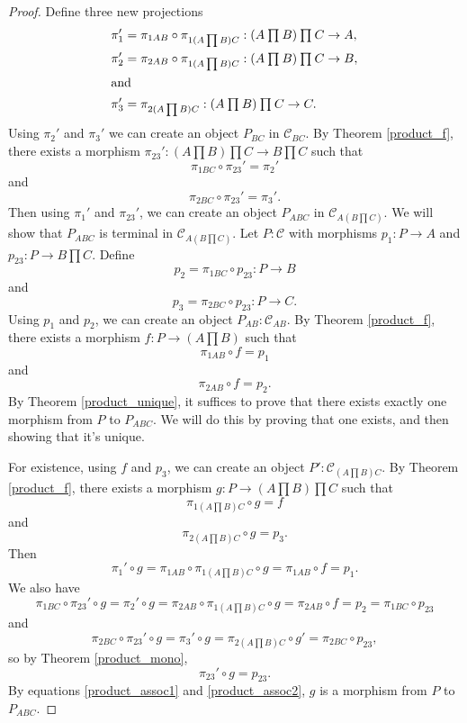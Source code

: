 \documentclass[../../math.tex]{subfiles}
\begin{document}
\begin{proof}
    Define three new projections
    \begin{align*}
        \pi_1' &= \pi_{1AB} \circ \pi_{1(A \prod B) C}
            : (A \mathbin{\textstyle{\prod}} B) \mathbin{\textstyle{\prod}} C \to A, \\
        \pi_2' &= \pi_{2AB} \circ \pi_{1(A \prod B) C}
            : (A \mathbin{\textstyle{\prod}} B) \mathbin{\textstyle{\prod}} C \to B, \\
    \intertext{and}
        \pi_3' &= \pi_{2(A \prod B) C}
            : (A \mathbin{\textstyle{\prod}} B) \mathbin{\textstyle{\prod}} C \to C.
    \end{align*}
    Using $\pi_2'$ and $\pi_3'$ we can create an object $P_{BC}$ in $\mathcal
    C_{BC}$.  By Theorem \ref{product_f}, there exists a morphism $\pi_{23}' :
    (A \prod B) \prod C \to B \prod C$ such that
    \[
        \pi_{1BC} \circ \pi_{23}' = \pi_2'
    \]
    and
    \[
        \pi_{2BC} \circ \pi_{23}' = \pi_3'.
    \]
    Then using $\pi_1'$ and $\pi_{23}'$, we can create an object $P_{ABC}$ in
    $\mathcal C_{A(B \prod C)}$.  We will show that $P_{ABC}$ is terminal in
    $\mathcal C_{A(B \prod C)}$.  Let $P : \mathcal C$ with morphisms $p_1 : P
    \to A$ and $p_{23} : P \to B \prod C$.  Define
    \[
        p_2 = \pi_{1BC} \circ p_{23} : P \to B
    \]
    and
    \[
        p_3 = \pi_{2BC} \circ p_{23} : P \to C.
    \]
    Using $p_1$ and $p_2$, we can create an object $P_{AB} : \mathcal C_{AB}$.
    By Theorem \ref{product_f}, there exists a morphism $f : P \to (A \prod B)$
    such that
    \[
        \pi_{1AB} \circ f = p_1
    \]
    and
    \[
        \pi_{2AB} \circ f = p_2.
    \]
    By Theorem \ref{product_unique}, it suffices to prove that there exists
    exactly one morphism from $P$ to $P_{ABC}$.  We will do this by proving that
    one exists, and then showing that it's unique.

    For existence, using $f$ and $p_3$, we can create an object $P' : \mathcal
    C_{(A \prod B) C}$.  By Theorem \ref{product_f}, there exists a morphism $g
    : P \to (A \prod B) \prod C$ such that
    \[
        \pi_{1 (A \prod B) C} \circ g = f
    \]
    and
    \[
        \pi_{2 (A \prod B) C} \circ g = p_3.
    \]
    Then
    \begin{equation} \label{product_assoc1}
        \pi_1' \circ g
        = \pi_{1AB} \circ \pi_{1 (A \prod B) C} \circ g
        = \pi_{1AB} \circ f = p_1.
    \end{equation}
    We also have
    \[
        \pi_{1BC} \circ \pi_{23}' \circ g
        = \pi_2' \circ g
        = \pi_{2AB} \circ \pi_{1 (A \prod B) C} \circ g
        = \pi_{2AB} \circ f
        = p_2
        = \pi_{1BC} \circ p_{23}
    \]
    and
    \[
        \pi_{2BC} \circ \pi_{23}' \circ g
        = \pi_3' \circ g
        = \pi_{2 (A \prod B) C} \circ g'
        = \pi_{2BC} \circ p_{23},
    \]
    so by Theorem \ref{product_mono},
    \begin{equation} \label{product_assoc2}
        \pi_{23}' \circ g = p_{23}.
    \end{equation}
    By equations \ref{product_assoc1} and \ref{product_assoc2}, $g$ is a
    morphism from $P$ to $P_{ABC}$.


\end{proof}
\end{document}
